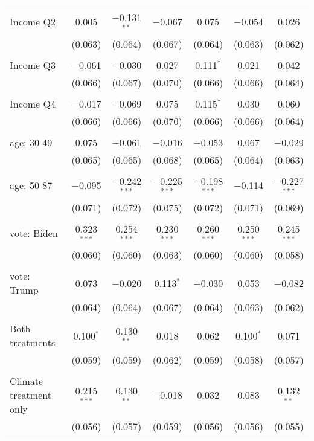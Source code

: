 \begin{tabular}{@{\extracolsep{5pt}}lcccccc}
  & & & & & & \\ 
 Income Q2 & 0.005 & $-$0.131$^{**}$ & $-$0.067 & 0.075 & $-$0.054 & 0.026 \\ 
  & (0.063) & (0.064) & (0.067) & (0.064) & (0.063) & (0.062) \\ 
  & & & & & & \\ 
 Income Q3 & $-$0.061 & $-$0.030 & 0.027 & 0.111$^{*}$ & 0.021 & 0.042 \\ 
  & (0.066) & (0.067) & (0.070) & (0.066) & (0.066) & (0.064) \\ 
  & & & & & & \\ 
 Income Q4 & $-$0.017 & $-$0.069 & 0.075 & 0.115$^{*}$ & 0.030 & 0.060 \\ 
  & (0.066) & (0.066) & (0.070) & (0.066) & (0.066) & (0.064) \\ 
  & & & & & & \\ 
 age: 30-49 & 0.075 & $-$0.061 & $-$0.016 & $-$0.053 & 0.067 & $-$0.029 \\ 
  & (0.065) & (0.065) & (0.068) & (0.065) & (0.064) & (0.063) \\ 
  & & & & & & \\ 
 age: 50-87 & $-$0.095 & $-$0.242$^{***}$ & $-$0.225$^{***}$ & $-$0.198$^{***}$ & $-$0.114 & $-$0.227$^{***}$ \\ 
  & (0.071) & (0.072) & (0.075) & (0.072) & (0.071) & (0.069) \\ 
  & & & & & & \\ 
 vote: Biden & 0.323$^{***}$ & 0.254$^{***}$ & 0.230$^{***}$ & 0.260$^{***}$ & 0.250$^{***}$ & 0.245$^{***}$ \\ 
  & (0.060) & (0.060) & (0.063) & (0.060) & (0.060) & (0.058) \\ 
  & & & & & & \\ 
 vote: Trump & 0.073 & $-$0.020 & 0.113$^{*}$ & $-$0.030 & 0.053 & $-$0.082 \\ 
  & (0.064) & (0.064) & (0.067) & (0.064) & (0.063) & (0.062) \\ 
  & & & & & & \\ 
 Both treatments & 0.100$^{*}$ & 0.130$^{**}$ & 0.018 & 0.062 & 0.100$^{*}$ & 0.071 \\ 
  & (0.059) & (0.059) & (0.062) & (0.059) & (0.058) & (0.057) \\ 
  & & & & & & \\ 
 Climate treatment only & 0.215$^{***}$ & 0.130$^{**}$ & $-$0.018 & 0.032 & 0.083 & 0.132$^{**}$ \\ 
  & (0.056) & (0.057) & (0.059) & (0.056) & (0.056) & (0.055) \\ 

\end{tabular}

